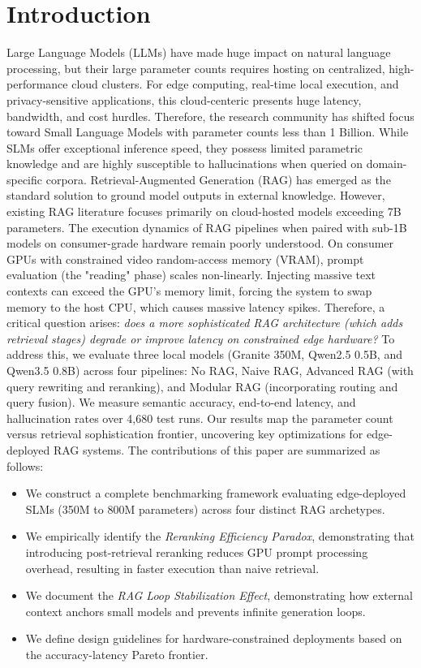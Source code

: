 \documentclass[conference]{IEEEtran}
\begin{document}
\section{Introduction}
Large Language Models (LLMs) have made huge impact on natural language processing, but their large parameter counts requires hosting on centralized, high-performance cloud clusters. For edge computing, real-time local execution, and privacy-sensitive applications, this cloud-centeric presents huge latency, bandwidth, and cost hurdles. Therefore, the research community has shifted focus toward Small Language Models with parameter counts less than 1 Billion.
While SLMs offer exceptional inference speed, they possess limited parametric knowledge and are highly susceptible to hallucinations when queried on domain-specific corpora. Retrieval-Augmented Generation (RAG) has emerged as the standard solution to ground model outputs in external knowledge. However, existing RAG literature focuses primarily on cloud-hosted models exceeding 7B parameters. The execution dynamics of RAG pipelines when paired with sub-1B models on consumer-grade hardware remain poorly understood.
On consumer GPUs with constrained video random-access memory (VRAM), prompt evaluation (the "reading" phase) scales non-linearly. Injecting massive text contexts can exceed the GPU's memory limit, forcing the system to swap memory to the host CPU, which causes massive latency spikes. Therefore, a critical question arises: \textit{does a more sophisticated RAG architecture (which adds retrieval stages) degrade or improve latency on constrained edge hardware?}
To address this, we evaluate three local models (Granite 350M, Qwen2.5 0.5B, and Qwen3.5 0.8B) across four pipelines: No RAG, Naive RAG, Advanced RAG (with query rewriting and reranking), and Modular RAG (incorporating routing and query fusion). We measure semantic accuracy, end-to-end latency, and hallucination rates over 4,680 test runs. Our results map the parameter count versus retrieval sophistication frontier, uncovering key optimizations for edge-deployed RAG systems.
The contributions of this paper are summarized as follows:
\begin{itemize}
    \item We construct a complete benchmarking framework evaluating edge-deployed SLMs (350M to 800M parameters) across four distinct RAG archetypes.
    \item We empirically identify the \textit{Reranking Efficiency Paradox}, demonstrating that introducing post-retrieval reranking reduces GPU prompt processing overhead, resulting in faster execution than naive retrieval.
    \item We document the \textit{RAG Loop Stabilization Effect}, demonstrating how external context anchors small models and prevents infinite generation loops.
    \item We define design guidelines for hardware-constrained deployments based on the accuracy-latency Pareto frontier.
\end{itemize}
\end{document}
